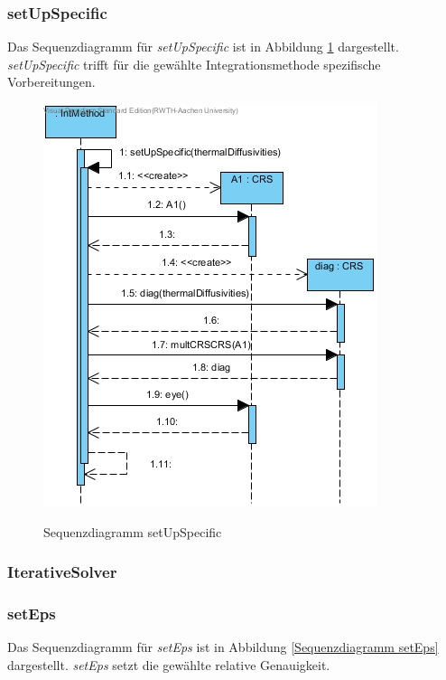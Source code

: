 \subsubsection*{setUpSpecific}

Das Sequenzdiagramm für \emph{setUpSpecific} ist in Abbildung \ref{Sequenzdiagramm setUpSpecific} dargestellt. \emph{setUpSpecific} trifft für die gewählte Integrationsmethode spezifische Vorbereitungen.

\begin{figure}[H]
	\centering
	\includegraphics[scale=.6]{Bilder/IntMethod__setUpSpecific().jpg}\\
	\caption{Sequenzdiagramm setUpSpecific}
	\label{Sequenzdiagramm setUpSpecific}
\end{figure}

\subsubsection{IterativeSolver}

\subsubsection*{setEps}

Das Sequenzdiagramm für \emph{setEps} ist in  Abbildung \ref{Sequenzdiagramm setEps} dargestellt. \emph{setEps} setzt die gewählte relative Genauigkeit.

